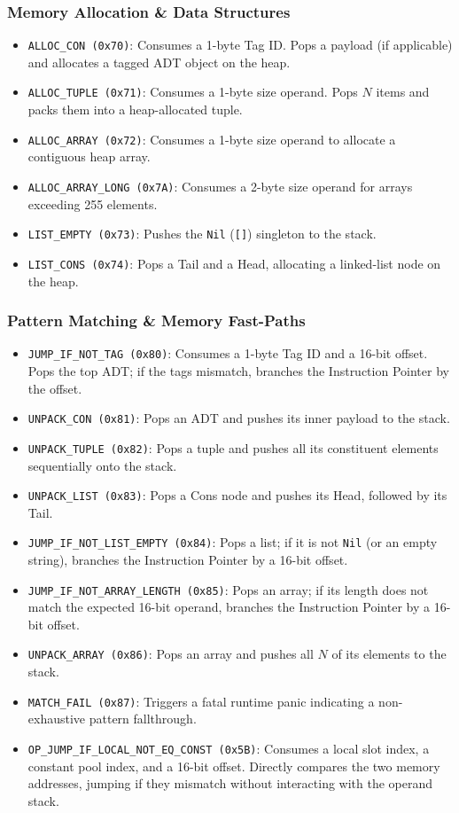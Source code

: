 \documentclass[11pt, a4paper]{article}
\begin{document}
\subsubsection*{Memory Allocation \& Data Structures}
\begin{itemize}
    \item \texttt{ALLOC\_CON (0x70)}: Consumes a 1-byte Tag ID. Pops a payload (if applicable) and allocates a tagged ADT object on the heap.
    \item \texttt{ALLOC\_TUPLE (0x71)}: Consumes a 1-byte size operand. Pops $N$ items and packs them into a heap-allocated tuple.
    \item \texttt{ALLOC\_ARRAY (0x72)}: Consumes a 1-byte size operand to allocate a contiguous heap array.
    \item \texttt{ALLOC\_ARRAY\_LONG (0x7A)}: Consumes a 2-byte size operand for arrays exceeding 255 elements.
    \item \texttt{LIST\_EMPTY (0x73)}: Pushes the \texttt{Nil} (\texttt{[]}) singleton to the stack.
    \item \texttt{LIST\_CONS (0x74)}: Pops a Tail and a Head, allocating a linked-list node on the heap.
\end{itemize}

\subsubsection*{Pattern Matching \& Memory Fast-Paths}
\begin{itemize} 
    \item \texttt{JUMP\_IF\_NOT\_TAG (0x80)}: Consumes a 1-byte Tag ID and a 16-bit offset. Pops the top ADT; if the tags mismatch, branches the Instruction Pointer by the offset.    \item \texttt{UNPACK\_CON (0x81)}: Pops an ADT and pushes its inner payload to the stack.
    \item \texttt{UNPACK\_TUPLE (0x82)}: Pops a tuple and pushes all its constituent elements sequentially onto the stack.
    \item \texttt{UNPACK\_LIST (0x83)}: Pops a Cons node and pushes its Head, followed by its Tail.
    \item \texttt{JUMP\_IF\_NOT\_LIST\_EMPTY (0x84)}: Pops a list; if it is not \texttt{Nil} (or an empty string), branches the Instruction Pointer by a 16-bit offset.
    \item \texttt{JUMP\_IF\_NOT\_ARRAY\_LENGTH (0x85)}: Pops an array; if its length does not match the expected 16-bit operand, branches the Instruction Pointer by a 16-bit offset.
    \item \texttt{UNPACK\_ARRAY (0x86)}: Pops an array and pushes all $N$ of its elements to the stack.
    \item \texttt{MATCH\_FAIL (0x87)}: Triggers a fatal runtime panic indicating a non-exhaustive pattern fallthrough.
    \item \texttt{OP\_JUMP\_IF\_LOCAL\_NOT\_EQ\_CONST (0x5B)}: Consumes a local slot index, a constant pool index, and a 16-bit offset. Directly compares the two memory addresses, jumping if they mismatch without interacting with the operand stack.
\end{itemize}
\end{document}

